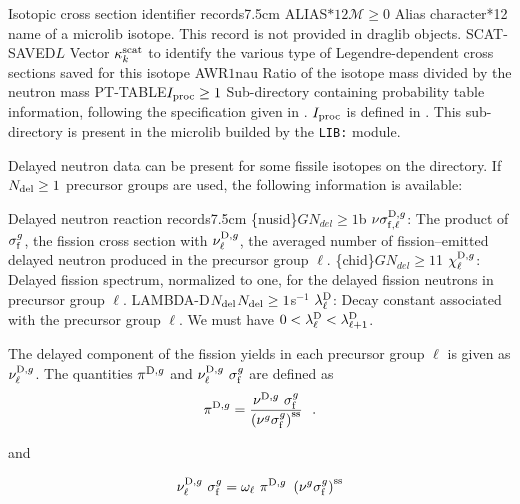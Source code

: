 \begin{DescriptionEnregistrement}{Isotopic cross section identifier records}{7.5cm}
\label{tabl:tabiso1}
\OptCharEnr
  {ALIAS}{$*12$}{$\mathcal{M} \ge 0$}
  {Alias character*12 name of a microlib isotope. This record is not provided in {\sc draglib} objects.}
\IntEnr
  {SCAT-SAVED}{$L$}
  {Vector $\kappa^{\rm scat}_{k}$ to identify the various type of
   Legendre-dependent cross sections saved for this isotope}
\RealEnr
  {AWR}{$1$}{nau}
  {Ratio of the isotope mass divided by the neutron mass}
\OptDirEnr
  {PT-TABLE}{$I_{\rm proc}\ge 1$}
  {Sub-directory containing probability table information, following the specification given in .
  $I_{\rm proc}$ is defined in . This sub-directory is present in the microlib builded by the {\tt LIB:} module.}
\end{DescriptionEnregistrement}

Delayed neutron data can be present for some fissile isotopes on the  directory. If $N_{\rm
del}\ge 1$ precursor groups are used, the following information is available:

\begin{DescriptionEnregistrement}{Delayed neutron reaction
records}{7.5cm}
\label{tabl:tabiso2}
\OptRealVar
  {\{nusid\}}{$G$}{$N_{del}\ge 1$}{b}
  {$\nu\sigma_{{\rm f},\ell}^{{\rm D},g}$: The product of $\sigma_{\rm f}^{g}$, the fission cross section with
   $\nu_{\ell}^{{\rm D},g}$, the averaged number of fission--emitted delayed
   neutron produced in the precursor group $\ell$.}
\OptRealVar
  {\{chid\}}{$G$}{$N_{del}\ge 1$}{1}
  {$\chi^{{\rm D},g}_\ell$: Delayed fission spectrum, normalized to one, for the delayed fission
   neutrons in precursor group $\ell$.}
\OptRealEnr
  {LAMBDA-D}{$N_{\rm del}$}{$N_{\rm del}\ge 1$}{s$^{-1}$}
  {$\lambda^{\rm D}_\ell$: Decay constant associated with the precursor group $\ell$. We must have
   $0 <\lambda^{\rm D}_\ell<\lambda^{\rm D}_{\ell+1}$.}
\end{DescriptionEnregistrement}

The delayed component of the fission yields in each precursor group $\ell$ is given as
$\nu_\ell^{{\rm D},g}$. The quantities $\pi^{{\rm D},g}$ and $\nu_\ell^{{\rm D},g} \ \sigma_{\rm f}^g$ are defined as
$$\pi^{{\rm D},g}={\nu^{{\rm D},g} \ \sigma_{\rm f}^g \over
   \left( \nu^g \sigma_{\rm f}^g \right)^{\rm ss}} \ \ .$$

\noindent and

$$\nu_\ell^{{\rm D},g} \ \sigma_{\rm f}^g=\omega_\ell \ \pi^{{\rm D},g} \
   \left( \nu^g \sigma_{\rm f}^g \right)^{\rm ss}$$

